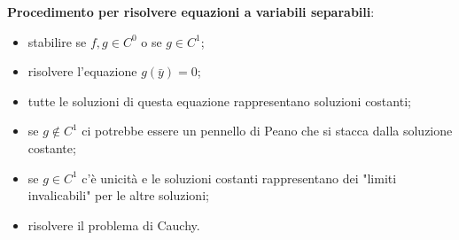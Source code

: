 \newline
\textbf{Procedimento per risolvere equazioni a variabili separabili}:
\begin{itemize}
    \item stabilire se $f,g \in C^0$ o se $g \in C^1$;
    \item risolvere l'equazione $g(\bar{y}) = 0$;
    \item tutte le soluzioni di questa equazione rappresentano soluzioni costanti;
    \item se $g \notin C^1$ ci potrebbe essere un pennello di Peano che si stacca dalla soluzione costante;
    \item se $g \in C^1$ c'è unicità e le soluzioni costanti rappresentano dei "limiti invalicabili" per le altre soluzioni;
    \item risolvere il problema di Cauchy.
\end{itemize}
